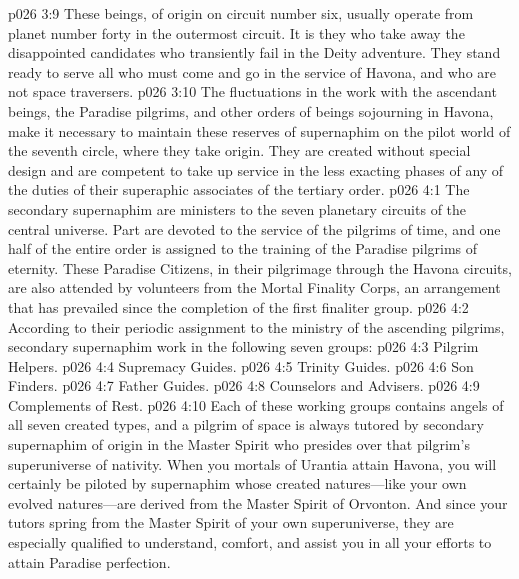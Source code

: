 \pc \vs p026 3:9 \bibnobreakspace {} These beings, of origin on circuit number six, usually operate from planet number forty in the outermost circuit. It is they who take away the disappointed candidates who transiently fail in the Deity adventure. They stand ready to serve all who must come and go in the service of Havona, and who are not space traversers.
\pc \vs p026 3:10 \bibnobreakspace {} The fluctuations in the work with the ascendant beings, the Paradise pilgrims, and other orders of beings sojourning in Havona, make it necessary to maintain these reserves of supernaphim on the pilot world of the seventh circle, where they take origin. They are created without special design and are competent to take up service in the less exacting phases of any of the duties of their superaphic associates of the tertiary order.
\vs p026 4:1 The secondary supernaphim are ministers to the seven planetary circuits of the central universe. Part are devoted to the service of the pilgrims of time, and one half of the entire order is assigned to the training of the Paradise pilgrims of eternity. These Paradise Citizens, in their pilgrimage through the Havona circuits, are also attended by volunteers from the Mortal Finality Corps, an arrangement that has prevailed since the completion of the first finaliter group.
\pc \vs p026 4:2 According to their periodic assignment to the ministry of the ascending pilgrims, secondary supernaphim work in the following seven groups:
\pc \vs p026 4:3 \bibnobreakspace Pilgrim Helpers.
\vs p026 4:4 \bibnobreakspace Supremacy Guides.
\vs p026 4:5 \bibnobreakspace Trinity Guides.
\vs p026 4:6 \bibnobreakspace Son Finders.
\vs p026 4:7 \bibnobreakspace Father Guides.
\vs p026 4:8 \bibnobreakspace Counselors and Advisers.
\vs p026 4:9 \bibnobreakspace Complements of Rest.
\pc \vs p026 4:10 Each of these working groups contains angels of all seven created types, and a pilgrim of space is always tutored by secondary supernaphim of origin in the Master Spirit who presides over that pilgrim’s superuniverse of nativity. When you mortals of Urantia attain Havona, you will certainly be piloted by supernaphim whose created natures---like your own evolved natures---are derived from the Master Spirit of Orvonton. And since your tutors spring from the Master Spirit of your own superuniverse, they are especially qualified to understand, comfort, and assist you in all your efforts to attain Paradise perfection.
